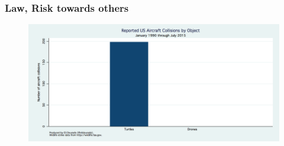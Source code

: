 \begin{frame}
\frametitle{Law, Risk towards others}
  
  \begin{figure}
  \includegraphics[scale=0.3]{pic/03_our-copter/turtle.png}
  \end{figure}

\end{frame}
